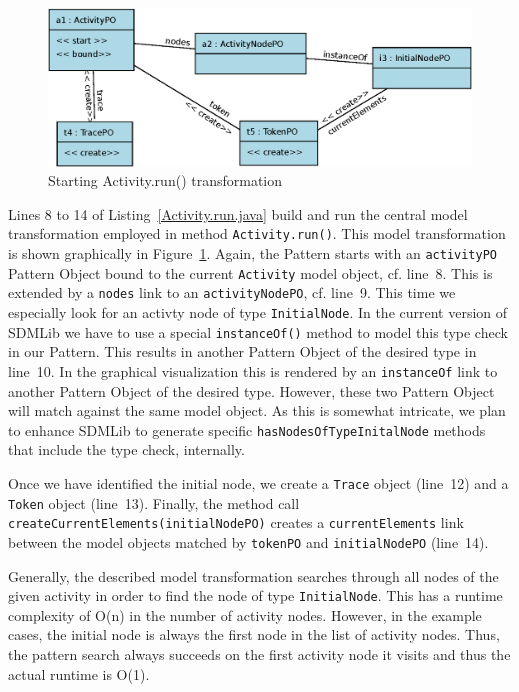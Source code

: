 \documentclass[submission,copyright,creativecommons]{eptcs}
\begin{document}
\begin{figure}[ht] \centering
	\includegraphics[width=\linewidth]{images/Activity.run.eps}
 \caption{Starting Activity.run() transformation}
 \label{fig:Activity.run}
\end{figure}

Lines 8 to 14 of Listing~\ref{Activity.run.java} build and run the central model 
transformation employed in method \texttt{Activity.run()}. This model transformation 
is shown graphically in Figure~\ref{fig:Activity.run}. Again, the Pattern starts with an \texttt{activityPO} Pattern Object bound to the current \texttt{Activity} model object, 
cf. line~8. This is extended by a \texttt{nodes} link to an \texttt{activityNodePO}, 
cf. line~9. This time we especially look for an activty node of type 
\texttt{InitialNode}. In the current version of SDMLib we have to use a special \texttt{instanceOf()} method to model this type check in our Pattern. This results in another Pattern Object of the desired type in line~10. In the graphical visualization this is rendered by an \texttt{instanceOf} link to another Pattern Object of the 
desired type. However, these two Pattern Object will match against the same model object. As this is somewhat intricate, we plan to enhance SDMLib to generate specific 
\texttt{hasNodesOfTypeInitalNode} methods that include the type check, internally.  

Once we have identified the initial node, we create a \texttt{Trace} object (line~12) 
and a \texttt{Token} object (line~13). Finally, the method call 
\texttt{createCurrentElements(initialNodePO)} creates a \texttt{currentElements} link between the model objects matched by \texttt{tokenPO} and \texttt{initialNodePO} (line~14).

Generally, the described model transformation searches through all nodes of the given activity 
in order to find the node of type \texttt{InitialNode}. This has a runtime complexity of O(n) in the number of activity nodes. However, in the example cases, the initial node is always the first node in the list of activity nodes. Thus, the pattern search always succeeds on the first activity node it visits and thus the actual runtime is O(1).
\end{document}

